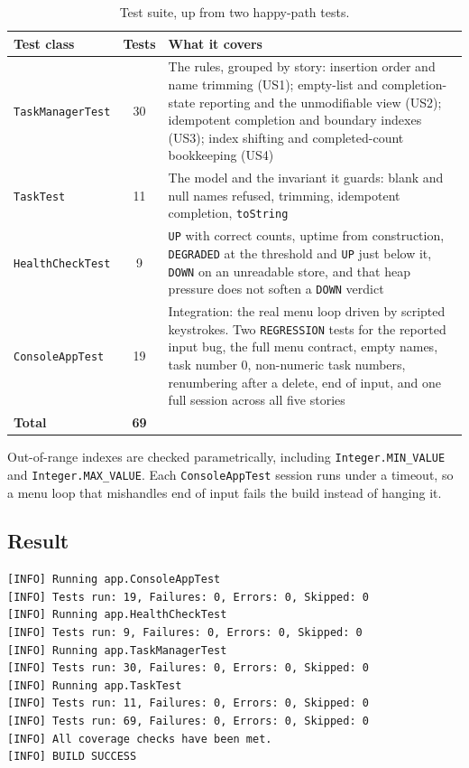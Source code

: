 \documentclass[11pt,a4paper]{article}
\newcommand{\code}[1]{\texttt{\small #1}}
\begin{document}
\begin{table}[h]
\centering
\small
\begin{tabularx}{\textwidth}{@{}l c X@{}}
\toprule
\textbf{Test class} & \textbf{Tests} & \textbf{What it covers} \\
\midrule
\code{TaskManagerTest} & 30 & The rules, grouped by story: insertion order and name trimming (US1); empty-list and completion-state reporting and the unmodifiable view (US2); idempotent completion and boundary indexes (US3); index shifting and completed-count bookkeeping (US4) \\
\code{TaskTest} & 11 & The model and the invariant it guards: blank and null names refused, trimming, idempotent completion, \code{toString} \\
\code{HealthCheckTest} & 9 & \code{UP} with correct counts, uptime from construction, \code{DEGRADED} at the threshold and \code{UP} just below it, \code{DOWN} on an unreadable store, and that heap pressure does not soften a \code{DOWN} verdict \\
\code{ConsoleAppTest} & 19 & Integration: the real menu loop driven by scripted keystrokes. Two \code{REGRESSION} tests for the reported input bug, the full menu contract, empty names, task number 0, non-numeric task numbers, renumbering after a delete, end of input, and one full session across all five stories \\
\midrule
\textbf{Total} & \textbf{69} & \\
\bottomrule
\end{tabularx}
\caption{Test suite, up from two happy-path tests.}
\end{table}

Out-of-range indexes are checked parametrically, including
\code{Integer.MIN\_VALUE} and \code{Integer.MAX\_VALUE}. Each
\code{ConsoleAppTest} session runs under a timeout, so a menu loop that
mishandles end of input fails the build instead of hanging it.

\subsection{Result}

\begin{lstlisting}[style=plain]
[INFO] Running app.ConsoleAppTest
[INFO] Tests run: 19, Failures: 0, Errors: 0, Skipped: 0
[INFO] Running app.HealthCheckTest
[INFO] Tests run: 9, Failures: 0, Errors: 0, Skipped: 0
[INFO] Running app.TaskManagerTest
[INFO] Tests run: 30, Failures: 0, Errors: 0, Skipped: 0
[INFO] Running app.TaskTest
[INFO] Tests run: 11, Failures: 0, Errors: 0, Skipped: 0
[INFO] Tests run: 69, Failures: 0, Errors: 0, Skipped: 0
[INFO] All coverage checks have been met.
[INFO] BUILD SUCCESS
\end{lstlisting}
\end{document}
